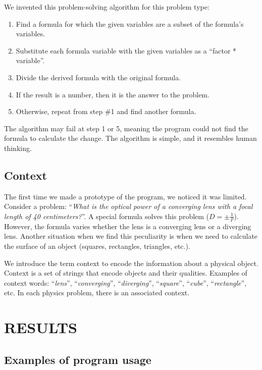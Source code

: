 \documentclass[a4paper, 12pt]{article}
\newcommand{\etext}[1]{\enquote{\textit{#1}}}
\begin{document}
	We invented this problem-solving algorithm for this problem type:
	
	\begin{enumerate}
	\item
	  Find a formula for which the given variables are a subset of the
	  formula's variables.
	\item
	  Substitute each formula variable with the given variables as a
	  \enquote{factor * variable}.
	\item
	  Divide the derived formula with the original formula.
	\item
	  If the result is a number, then it is the answer to the problem.
	\item
	  Otherwise, repeat from step \#1 and find another formula.
	\end{enumerate}
	
	The algorithm may fail at step 1 or 5, meaning the program could not
	find the formula to calculate the change. The algorithm is simple, and
	it resembles human thinking.
	
	\subsection{Context}
	
	The first time we made a prototype of the program, we noticed it was
	limited. Consider a problem: \etext{What is the optical power of a
	converging lens with a focal length of 40 centimeters?}. A special
	formula solves this problem (\(D = \pm \frac{1}{F}\)). However, the
	formula varies whether the lens is a converging lens or a diverging
	lens. Another situation when we find this peculiarity is when we need to
	calculate the surface of an object (squares, rectangles, triangles,
	etc.).
	
	We introduce the term context to encode the information about a physical
	object. Context is a set of strings that encode objects and their
	qualities. Examples of context words: \etext{lens},
	\etext{converging}, \etext{diverging}, \etext{square},
	\etext{cube}, \etext{rectangle}, etc. In each physics problem,
	there is an associated context.
	
	\section{RESULTS}
	
	\subsection{Examples of program usage}
	
\end{document}
